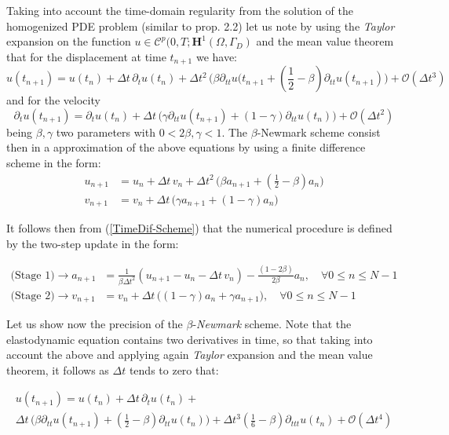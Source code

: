 Taking into account the time-domain regularity from the solution of the homogenized PDE problem (similar to prop. 2.2) let us note by using the \textit{Taylor} expansion on the function $u \in \mathcal{C}^{p}(0,T;\mathbf{H}^1(\Omega, \Gamma_D)$ and the mean value theorem that for the displacement at time $t_{n+1}$ we have:
\begin{equation*}
    u(t_{n+1}) = u(t_n) + \Delta t \, \partial_{t} u(t_n) + \Delta t^2 \, \big( \beta \partial_{tt} u(t_{n+1} + (\frac{1}{2} - \beta) \partial_{tt} u(t_{n+1}) \big) + \mathcal{O}(\Delta t^3)    
\end{equation*}
and for the velocity
\begin{equation*}
    \partial_{t} u(t_{n+1}) = \partial_{t} u (t_{n}) + \Delta t \, \big( \gamma \partial_{tt} u(t_{n+1}) + (1-\gamma) \partial_{tt} u(t_n) \big) + \mathcal{O}(\Delta t^2)
\end{equation*}
being $\beta, \gamma$ two parameters with $0 < 2\beta, \gamma < 1$.
The $\beta$-Newmark scheme consist then in a approximation of the above equations by using a finite difference scheme in the form:
\begin{align}
    \label{TimeDif-Scheme}
    u_{n+1} &= u_{n} + \Delta t\, v_{n} + \Delta t^2 \, \big( \beta a_{n+1} + (\frac{1}{2} - \beta) a_n \big) \\
    v_{n+1} &= v_n + \Delta t\, \big( \gamma a_{n+1} + (1-\gamma) a_{n} \big)
\end{align}

It follows then from (\ref{TimeDif-Scheme}) that the numerical procedure is defined by the two-step update in the form:

\begin{align}
    \label{TwoStage-Update}
    \text{(Stage 1)}\longrightarrow  a_{n+1} &= \frac{1}{\beta \Delta t^2} ( u_{n+1}-u_n - \Delta t \, v_n) - \frac{(1-2\beta)}{2 \beta} a_n, \quad \forall 0 \leq n \leq N-1 \\
    \text{(Stage 2)}\longrightarrow v_{n+1} &= v_n + \Delta t \, \big( (1-\gamma) a_n + \gamma a_{n+1} \big), \quad \forall 0 \leq n \leq N-1
\end{align}

Let us show now the precision of the $\beta$-\textit{Newmark} scheme. Note that the elastodynamic equation contains two derivatives in time, so that taking into account the above and applying again \textit{Taylor} expansion and the mean value theorem, it follows as $\Delta t$ tends to zero that:

\begin{multline}
    u(t_{n+1}) = u(t_{n}) + \Delta t \, \partial_{t} u(t_n) + \\
    \Delta t \, \big( \beta \partial_{tt} u(t_{n+1}) + (\frac{1}{2}- \beta) \partial_{tt} u(t_n) \big) + \Delta t^3 (\frac{1}{6}-\beta) \partial_{ttt}u(t_n) + \mathcal{O}(\Delta t^4)
\end{multline}


